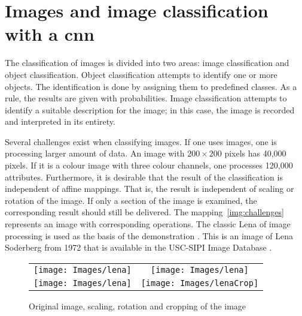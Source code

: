 %
%




\section{Images and image classification with a \ac{cnn}}


The classification of images is divided into two areas: image classification and object classification. 
Object classification attempts to identify one or more objects. The identification is done by assigning them to predefined classes. As a rule, the results are given with probabilities. Image classification attempts to identify a suitable description for the image; in this case, the image is recorded and interpreted in its entirety. \cite{Zhiqiang:2017}

Several challenges exist when classifying images. If one uses images, one is processing larger amount of data. An image with $200 \times 200$ pixels has 40,000 pixels. If it is a colour image with three colour channels, one processes 120,000 attributes. 
Furthermore, it is desirable that the result of the classification is independent of affine mappings. That is, the result is independent of scaling or rotation of the image. If only a section of the image is examined, the corresponding result should still be delivered. The mapping~\ref{img:challenges} represents an image with corresponding operations.  
The classic \glqq Lena\grqq{} of image processing is used as the basis of the demonstration \cite{Munson:1996}. This is an image of Lena Soderberg from 1972 that is available in the USC-SIPI Image Database \cite{Weber:1997}.



\begin{figure}[!h]
	\centering
	\begin{tabular}{cc}
		\texttt{[image: Images/lena]}    &
		\texttt{[image: Images/lena]}    \\
		\texttt{[image: Images/lena]}    &
		\texttt{[image: Images/lenaCrop]}    \\
	\end{tabular}
	\caption{Original image, scaling, rotation and cropping of the image}\label{img:Herausforderungen}
\end{figure}



